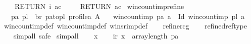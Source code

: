 \begin{isabellebody}
\ \ \ \ RETURN\ {\isacharparenleft}{\kern0pt}i{\isacharcomma}{\kern0pt}\ ac{\isacharparenright}{\kern0pt}\isanewline
\ \ {\isacharbraceright}{\kern0pt}{\isacharparenright}{\kern0pt}{\isacharparenleft}{\kern0pt}{}{\isacharcomma}{\kern0pt}{}{\isacharparenright}{\kern0pt}{\isacharsemicolon}{\kern0pt}\isanewline
\ \ RETURN\ ac\isanewline
{\isacharbraceright}{\kern0pt}{\isachardoublequoteclose}\isanewline
\isanewline
{}\isamarkupfalse%
\ win{\isacharunderscore}{\kern0pt}count{\isacharunderscore}{\kern0pt}imp{}{\isacharunderscore}{\kern0pt}refine{\isacharcolon}{\kern0pt}\isanewline
\ \ \ {\isachardoublequoteopen}{\isacharparenleft}{\kern0pt}pa{\isacharcomma}{\kern0pt}\ pl{\isacharparenright}{\kern0pt}\ {\isasymin}\ br\ pa{\isacharunderscore}{\kern0pt}to{\isacharunderscore}{\kern0pt}pl\ {\isacharparenleft}{\kern0pt}profile{\isacharunderscore}{\kern0pt}a\ A{\isacharparenright}{\kern0pt}{\isachardoublequoteclose}\isanewline
\ \ \ {\isachardoublequoteopen}win{\isacharunderscore}{\kern0pt}count{\isacharunderscore}{\kern0pt}imp{}\ pa\ a\ {\isasymle}\ {\isasymDown}Id\ {\isacharparenleft}{\kern0pt}win{\isacharunderscore}{\kern0pt}count{\isacharunderscore}{\kern0pt}imp{\isacharprime}{\kern0pt}\ pl\ a{\isacharparenright}{\kern0pt}{\isachardoublequoteclose}\isanewline
%
\isadelimproof
\ \ %
\endisadelimproof
%
\isatagproof
{}\isamarkupfalse%
\ win{\isacharunderscore}{\kern0pt}count{\isacharunderscore}{\kern0pt}imp{}{\isacharunderscore}{\kern0pt}def\ win{\isacharunderscore}{\kern0pt}count{\isacharunderscore}{\kern0pt}imp{\isacharprime}{\kern0pt}{\isacharunderscore}{\kern0pt}def\ winsr{\isacharunderscore}{\kern0pt}imp{\isacharprime}{\kern0pt}{\isacharunderscore}{\kern0pt}def\isanewline
\ \ \isamarkupfalse%
\ {\isacharparenleft}{\kern0pt}refine{\isacharunderscore}{\kern0pt}rcg{\isacharparenright}{\kern0pt}\isanewline
\ \ \isamarkupfalse%
\ {\isacharparenleft}{\kern0pt}refine{\isacharunderscore}{\kern0pt}dref{\isacharunderscore}{\kern0pt}type{\isacharparenright}{\kern0pt}\isanewline
\ \ \isamarkupfalse%
\ {\isacharparenleft}{\kern0pt}simp{\isacharunderscore}{\kern0pt}all{\isacharcomma}{\kern0pt}\ safe{\isacharparenright}{\kern0pt}\isanewline
{}\isamarkupfalse%
\ {\isacharparenleft}{\kern0pt}simp{\isacharunderscore}{\kern0pt}all{\isacharparenright}{\kern0pt}\isanewline
\ \ \isamarkupfalse%
\ x{}\isanewline
\ \ \isamarkupfalse%
\ ir{\isacharcolon}{\kern0pt}\ {\isachardoublequoteopen}x{}\ {\isacharless}{\kern0pt}\ array{\isacharunderscore}{\kern0pt}length\ pa{\isachardoublequoteclose}\isanewline

\end{isabellebody}
